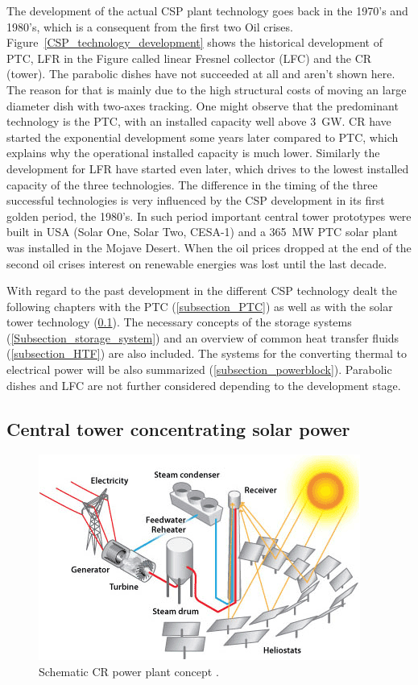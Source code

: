 The development of the actual CSP plant technology goes back in the 1970's and 1980's, which is a consequent from the first two Oil crises. Figure~\ref{CSP_technology_development} shows the historical development of PTC, LFR in the Figure called linear Fresnel collector (LFC) and the CR (tower). The parabolic dishes have not succeeded at all and aren't shown here. The reason for that is mainly due to the high structural costs of moving an large diameter dish with two-axes tracking. One might observe that the predominant technology is the PTC, with an installed capacity well above 3~GW. CR have started the exponential development some years later compared to PTC, which explains why the operational installed capacity is much lower. Similarly the development for LFR have started even later, which drives to the lowest installed capacity of the three technologies. The difference in the timing of the three successful technologies is very influenced by the CSP development in its first golden period, the 1980's. In such period important central tower prototypes were built in USA (Solar One, Solar Two, CESA-1) and a 365~MW PTC solar plant was installed in the Mojave Desert. When the oil prices dropped at the end of the second oil crises interest on renewable energies was lost until the last decade. 

With regard to the past development in the different CSP technology dealt the following chapters with the PTC (\ref{subsection_PTC}) as well as with the solar tower technology (\ref{subsection_CRS}). The necessary concepts of the storage systems (\ref{Subsection_storage_system}) and an overview of common heat transfer fluids (\ref{subsection_HTF}) are also included. The systems for the converting thermal to electrical power will be also summarized (\ref{subsection_powerblock}).  Parabolic dishes and LFC are not further considered depending to the development stage.
\pagebreak

\subsection{Central tower concentrating solar power} \label{subsection_CRS}

\begin{figure}[htbp] 
\centering
\includegraphics[width=0.6\linewidth]{FIG/power_tower}
\caption[Schematic CR power plant concept.]{Schematic CR power plant concept \cite{U.S.DOE2013}.}\label{power_tower}
\end{figure}



